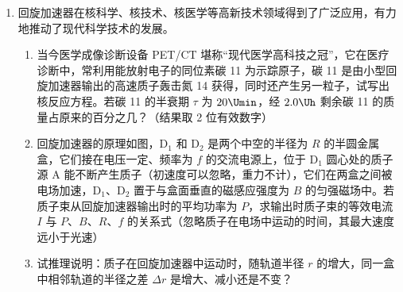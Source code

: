 \documentclass[\gkver]{gaokaozhenti}
\begin{document}
\begin{enumerate}
{（2）棒 ab 与棒 cd 受到的安培力大小相等 $F_{ab}=F_{cd}$，对棒 ab 由共点力平衡有 $F=mg\sin30^\circ+IlB$，代入数据解得 $F=0.2\UN$。

（3）设在时间 $t$ 内棒 cd 产生 $Q=0.1\UJ$ 热量，由焦耳定律可知 $Q=I^{2}Rt$，设 ab 棒匀速运动的速度大小为 $v$，则产生的感应电动势 $E=Blv$，由闭合电路欧姆定律知 $I=\frac{E}{2R}$，由运动学公式知，在时间 $t$ 内，棒 ab 沿导轨的位移 $x=vt$，力 $F$ 做的功 $W=Fx$，综合上述各式，代入数据解得 $W=0.4\UJ$。
}

\item
回旋加速器在核科学、核技术、核医学等高新技术领域得到了广泛应用，有力地推动了现代科学技术的发展。

\begin{enumerate}
	\item
	当今医学成像诊断设备 PET/CT 堪称“现代医学高科技之冠”，它在医疗诊断中，常利用能放射电子的同位素碳 11 为示踪原子，碳 11 是由小型回旋加速器输出的高速质子轰击氮 14 获得，同时还产生另一粒子，试写出核反应方程。若碳 11 的半衰期 $\tau$ 为 $20\Umin$，经 $2.0\Uh$ 剩余碳 11 的质量占原来的百分之几？（结果取 2 位有效数字）
	\item
	回旋加速器的原理如图，D$_{1}$ 和 D$_{2}$ 是两个中空的半径为 $R$ 的半圆金属盒，它们接在电压一定、频率为 $f$ 的交流电源上，位于 D$_{1}$ 圆心处的质子源 A 能不断产生质子（初速度可以忽略，重力不计），它们在两盒之间被电场加速，D$_{1}$、D$_{2}$ 置于与盒面垂直的磁感应强度为 $B$ 的匀强磁场中。若质子束从回旋加速器输出时的平均功率为 $P$，求输出时质子束的等效电流 $I$ 与 $P$、$B$、$R$、$f$ 的关系式（忽略质子在电场中运动的时间，其最大速度远小于光速）
	\item
	试推理说明：质子在回旋加速器中运动时，随轨道半径 $r$ 的增大，同一盒中相邻轨道的半径之差 $\Delta r$ 是增大、减小还是不变？
\end{enumerate}

\end{enumerate}
\end{document}
